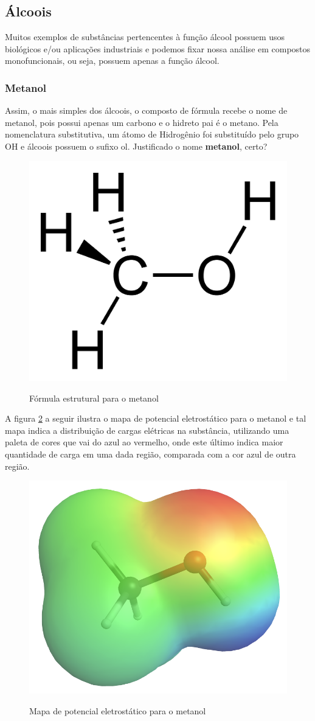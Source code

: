 \subsection{Álcoois}
Muitos exemplos de substâncias pertencentes à função álcool possuem usos biológicos e/ou aplicações industriais e podemos fixar nossa análise em compostos monofuncionais, ou seja, possuem apenas a função álcool.

\subsubsection{Metanol}
Assim, o mais simples dos álcoois, o composto de fórmula  recebe o nome de metanol, pois possui apenas um carbono e o hidreto pai é o metano. Pela nomenclatura substitutiva, um átomo de Hidrogênio foi substituído pelo grupo OH e álcoois possuem o sufixo ol. Justificado o nome \textbf{metanol}, certo?

\begin{figure}[h]
    \centering
    \caption{Fórmula estrutural para o metanol}
    \vspace{0.5cm}
    \includegraphics[width=0.35\linewidth]{imagens/methanol-2d-0349e4-1024.png}
\label{fig:mpemetanol}
\end{figure}

A figura \ref{fig:mpemetanol} a seguir ilustra o mapa de potencial eletrostático para o metanol e tal mapa indica a distribuição de cargas elétricas na substância, utilizando uma paleta de cores que vai do azul ao vermelho, onde este último indica maior quantidade de carga em uma dada região, comparada com a cor azul de outra região.

\begin{figure}[h]
    \centering
    \caption{Mapa de potencial eletrostático para o metanol}
    \vspace{0.5cm}
    \includegraphics[width=0.45\linewidth]{imagens/mpemetanol.png}
\label{fig:mpemetanol}
\end{figure}

